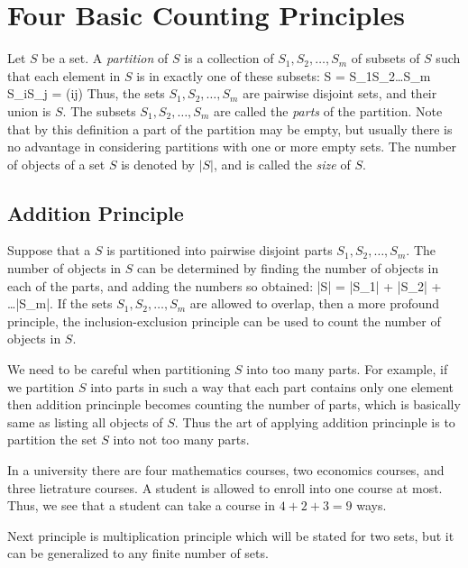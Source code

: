 \section{Four Basic Counting Principles}
Let $S$ be a set. A {\it partition} of $S$ is a collection of $S_1, S_2, \ldots, S_m$ of subsets of $S$ such that each element
in $S$ is in exactly one of these subsets:
\startformula S = S_1\cup S_2\cup\ldots\cup S_m\stopformula
\startformula S_i\cap S_j = \phi(i\neq j)\stopformula
Thus, the sets $S_1, S_2, \ldots, S_m$ are pairwise disjoint sets, and their union is $S$. The subsets $S_1, S_2, \ldots, S_m$ are
called the {\it parts} of the partition. Note that by this definition a part of the partition may be empty, but usually there is
no advantage in considering partitions with one or more empty sets. The number of objects of a set $S$ is denoted by $|S|$, and is
called the {\it size} of $S$.

\subsection{Addition Principle}
Suppose that a $S$ is partitioned into pairwise disjoint parts $S_1, S_2, \ldots, S_m$. The number of objects in $S$ can be
determined by finding the number of objects in each of the parts, and adding the numbers so obtained:
\startformula |S| = |S_1| + |S_2| + \ldots |S_m|.\stopformula
If the sets $S_1, S_2, \ldots, S_m$ are allowed to overlap, then a more profound principle, the inclusion-exclusion principle can
be used to count the number of objects in $S$.

We need to be careful when partitioning $S$ into too many parts. For example, if we partition $S$ into parts in such a way that
each part contains only one element then addition princinple becomes counting the number of parts, which is basically same as
listing all objects of $S$. Thus the art of applying addition princinple is to partition the set $S$ into not too many parts.

 In a university there are four mathematics courses, two economics courses, and three lietrature
courses. A student is allowed to enroll into one course at most. Thus, we see that a student can take a course in $4 + 2 + 3 = 9$
ways.

Next principle is multiplication principle which will be stated for two sets, but it can be generalized to any finite number of
sets.

